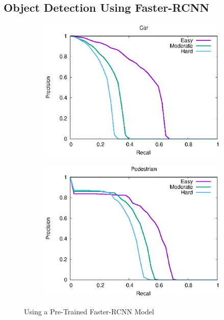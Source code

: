 \subsection{Object Detection Using Faster-RCNN}
\begin{figure}[H]
\begin{subfigure}{.5\textwidth}
    \centering
    \includegraphics[width=1.0\linewidth]{img/FRCNN_Nov_8/plot_valid/car_detection.eps}
\end{subfigure}%
\begin{subfigure}{.5\textwidth}
    \centering
    \includegraphics[width=1.0\linewidth]{img/FRCNN_Nov_8/plot_valid/pedestrian_detection.eps}
\end{subfigure}
\caption{Using a Pre-Trained Faster-RCNN Model}
\end{figure}


